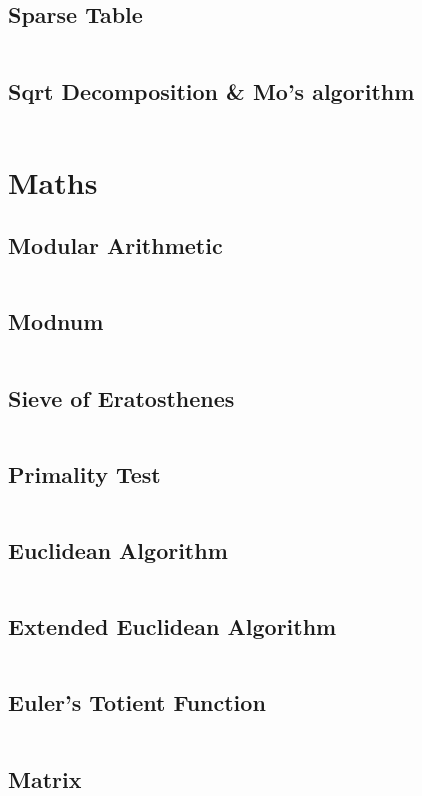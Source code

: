   \subsection{Sparse Table}
    \inputminted{cpp}{library/structures/sparse_table.hpp}
  \subsection{Sqrt Decomposition \& Mo's algorithm}
    \inputminted{cpp}{library/structures/mo.cpp}
    
\section{Maths}
  \subsection{Modular Arithmetic}
    \inputminted{cpp}{library/maths/mod.hpp}
  \subsection{Modnum}
    \inputminted{cpp}{library/maths/modnum.hpp}
  \subsection{Sieve of Eratosthenes}
    \inputminted{cpp}{library/maths/sieve.cpp}
  \subsection{Primality Test}
      \inputminted{cpp}{library/maths/primality.hpp}
  \subsection{Euclidean Algorithm}
    \inputminted{cpp}{library/maths/euclidean.hpp}
  \subsection{Extended Euclidean Algorithm}
    \inputminted{cpp}{library/maths/extended_euclidean.hpp}
  \subsection{Euler's Totient Function}
    \inputminted{cpp}{library/maths/euler_phi.hpp}
  \subsection{Matrix}
    \inputminted{cpp}{library/maths/matrix.hpp}

